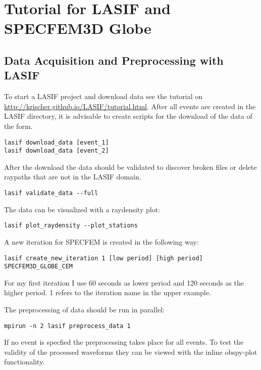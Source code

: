 

\chapter{Tutorial for LASIF and SPECFEM3D Globe}

\section{Data Acquisition and Preprocessing with LASIF}
To start a LASIF project and download data see the tutorial on \url{http://krischer.github.io/LASIF/tutorial.html}.
After all events are created in the LASIF directory, it is advisable to create scripts for the download of the data of the form.

\begin{lstlisting}
lasif download_data [event_1]
lasif download_data [event_2]
\end{lstlisting}

After the download the data should be validated to discover broken files or
delete raypaths that are not in the LASIF domain.

\begin{lstlisting} 
lasif validate_data --full
\end{lstlisting}

The data can be visualized with a raydensity plot:
\begin{lstlisting} 
lasif plot_raydensity --plot_stations
\end{lstlisting}

A new iteration for SPECFEM is created in the following way:
\begin{lstlisting} 
lasif create_new_iteration 1 [low period] [high period] SPECFEM3D_GLOBE_CEM
\end{lstlisting}

For my first iteration I use 60 seconds as lower period and 120 seconds as the
higher period. 1 refers to the iteration name in the upper example.

The preprocessing of data should be run in parallel:
\begin{lstlisting} 
mpirun -n 2 lasif preprocess_data 1
\end{lstlisting}

If no event is specfied the preprocessing takes place for all events.
To test the validity of the processed waveforms they can be viewed with
the inline obspy-plot functionality.

